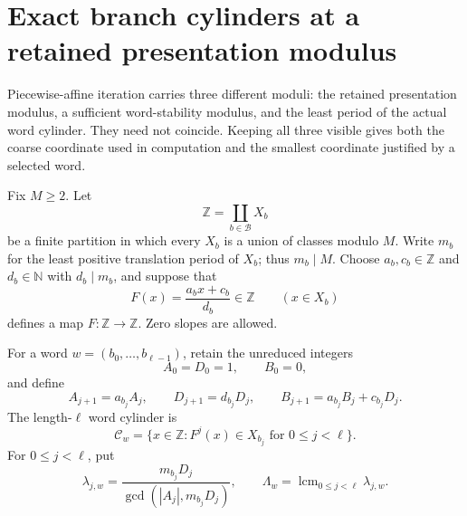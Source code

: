 \section{Exact branch cylinders at a retained presentation modulus}

Piecewise-affine iteration carries three different moduli: the retained
presentation modulus, a sufficient word-stability modulus, and the least
period of the actual word cylinder.  They need not coincide.  Keeping all
three visible gives both the coarse coordinate used in computation and the
smallest coordinate justified by a selected word.

\begin{definition}
\label{def:residue-affine-system}
Fix $M\ge2$.  Let
\[
 \mathbb Z=\coprod_{b\in\mathcal B}X_b
\]
be a finite partition in which every $X_b$ is a union of classes modulo
$M$.  Write $m_b$ for the least positive translation period of $X_b$; thus
$m_b\mid M$.  Choose $a_b,c_b\in\mathbb Z$ and $d_b\in\mathbb N$ with
$d_b\mid m_b$, and suppose that
\[
 F(x)=\frac{a_bx+c_b}{d_b}\in\mathbb Z\qquad(x\in X_b)
 \tag{1.1}\label{eq:branch-system}
\]
defines a map $F:\mathbb Z\to\mathbb Z$.  Zero slopes are allowed.
\end{definition}

For a word $w=(b_0,\ldots,b_{\ell-1})$, retain the unreduced integers
\[
 A_0=D_0=1,\qquad B_0=0,
\]
and define
\begin{equation}
 A_{j+1}=a_{b_j}A_j,\qquad
 D_{j+1}=d_{b_j}D_j,\qquad
 B_{j+1}=a_{b_j}B_j+c_{b_j}D_j.
 \label{eq:affine-word-recurrence}
\end{equation}
The length-$\ell$ word cylinder is
\[
 \mathcal C_w=
 \{x\in\mathbb Z:F^j(x)\in X_{b_j}\text{ for }0\le j<\ell\}.
\]
For $0\le j<\ell$, put
\begin{equation}
 \lambda_{j,w}=
 \frac{m_{b_j}D_j}{\gcd(|A_j|,m_{b_j}D_j)},
 \qquad
 \Lambda_w=\operatorname{lcm}_{0\le j<\ell}\lambda_{j,w}.
 \label{eq:coefficient-stability-modulus}
\end{equation}

